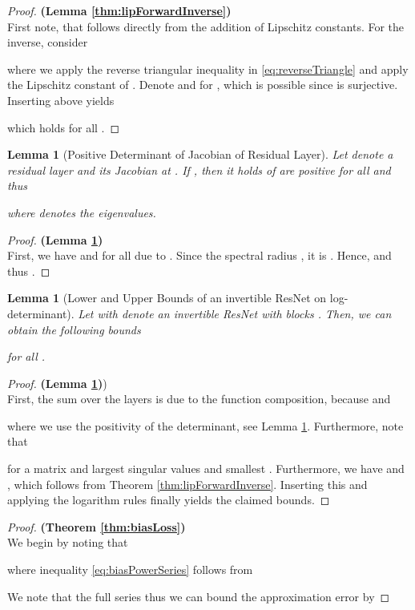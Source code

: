\documentclass{article}
\newtheorem{lemma}[theorem]{Lemma}
\begin{document}
\begin{proof}\textbf{(Lemma \ref{thm:lipForwardInverse})}\\
First note, that  follows directly from the addition of Lipschitz constants. For the inverse, consider

where we apply the reverse triangular inequality in \eqref{eq:reverseTriangle} and apply the Lipschitz constant of .
Denote  and  for , which is possible since  is surjective. Inserting above yields

which holds for all .
\end{proof}


\begin{lemma}[Positive Determinant of Jacobian of Residual Layer]
\label{thm:positiveDet}
Let  denote a residual layer and  its Jacobian at . If , then it holds  of  are positive for all  and thus

where  denotes the eigenvalues.
\end{lemma}
\begin{proof}\textbf{(Lemma \ref{thm:positiveDet})}\\
First, we have  and  for all  due to . Since the spectral radius , it is . Hence,  and thus .
\end{proof}

\begin{lemma}[Lower and Upper Bounds of an invertible ResNet on log-determinant]
\label{lem:lowerUpperBoundDeterminant}
Let  with  denote an invertible ResNet with blocks . Then, we can obtain the following bounds

for all .
\end{lemma}
\begin{proof}\textbf{(Lemma \ref{lem:lowerUpperBoundDeterminant})})\\
First, the sum over the layers is due to the function composition, because  and 

where we use the positivity of the determinant, see Lemma \ref{thm:positiveDet}. Furthermore, note that 

 for a matrix  and largest singular values  and smallest . Furthermore, we have  and , which follows from Theorem \ref{thm:lipForwardInverse}. Inserting this and applying the logarithm rules finally yields the claimed bounds.
\end{proof}


\begin{proof}\textbf{(Theorem \ref{thm:biasLoss})}\\
We begin by noting that

where inequality \eqref{eq:biasPowerSeries} follows from 


We note that the full series  thus we can bound the approximation error by

\end{proof}
\end{document}
